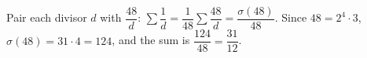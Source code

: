 Pair each divisor $d$ with $\dfrac{48}{d}$: $\sum\dfrac{1}{d}=\dfrac{1}{48}\sum\dfrac{48}{d}=\dfrac{\sigma(48)}{48}$. Since $48=2^4\cdot3$, $\sigma(48)=31\cdot4=124$, and the sum is $\dfrac{124}{48}=\boxed{\dfrac{31}{12}}$.
